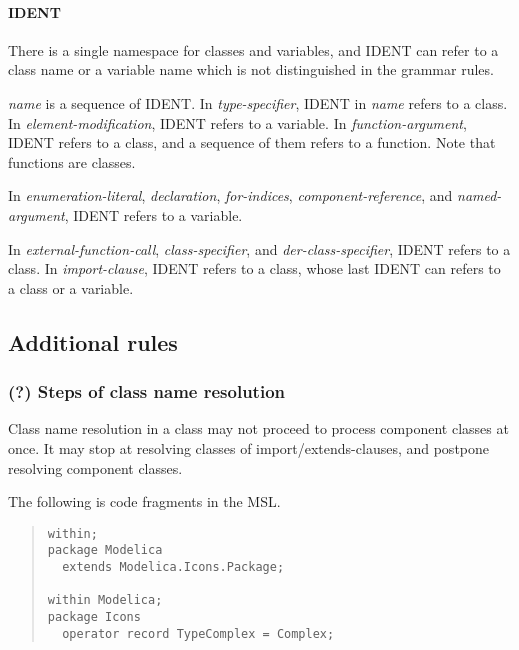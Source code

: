 \documentclass[10pt,b5paper]{article}
\begin{document}
\paragraph {IDENT}

There is a single namespace for classes and variables, and {IDENT} can
refer to a class name or a variable name which is not distinguished in
the grammar rules.

{\it{}name\/} is a sequence of {IDENT}.  In {\it{}type-specifier},
IDENT in {\it{}name\/} refers to a class.  In
{\it{}element-modification}, IDENT refers to a variable.  In
{\it{}function-argument}, IDENT refers to a class, and a sequence of
them refers to a function.  Note that functions are classes.

In {\it{}enumeration-literal}, {\it{}declaration}, {\it{}for-indices},
{\it{}component-reference}, and {\it{}named-argument}, IDENT refers to
a variable.

In {\it{}external-function-call}, {\it{}class-specifier}, and
{\it{}der-class-specifier}, IDENT refers to a class.  In
{\it{}import-clause}, IDENT refers to a class, whose last IDENT can
refers to a class or a variable.


\subsection{Additional rules}

\subsubsection*{(?) Steps of class name resolution}

Class name resolution in a class may not proceed to process component
classes at once.  It may stop at resolving classes of
import/extends-clauses, and postpone resolving component classes.

The following is code fragments in the MSL.

\begin{quote}
\begin{lstlisting}[aboveskip=-\baselineskip]
within;
package Modelica
  extends Modelica.Icons.Package;

within Modelica;
package Icons
  operator record TypeComplex = Complex;
\end{lstlisting}
\end{quote}
\end{document}

